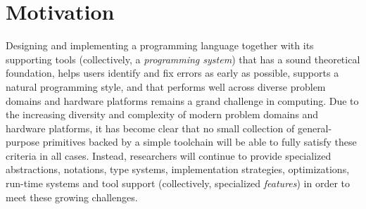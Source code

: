 \vspace{-25pt}
\section{Motivation}\label{motivation}
Designing and implementing a programming language together with its supporting tools (collectively, a \emph{programming system}) that has a sound theoretical foundation, helps users identify and fix errors as early as possible, supports a natural programming style, and that performs well across diverse problem domains and hardware platforms remains a grand challenge in computing. Due to the increasing diversity and complexity of modern problem domains and hardware platforms, it has become clear that no small  collection of general-purpose primitives backed by a simple toolchain will be able to fully satisfy these criteria in all cases. Instead,  researchers will continue to provide specialized abstractions, notations,  type systems, implementation strategies, optimizations, run-time systems and tool support (collectively, specialized \emph{features}) in order to meet these growing challenges. %


